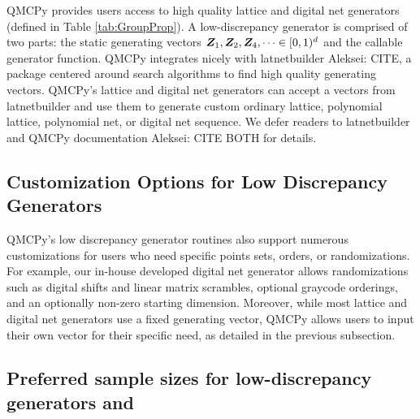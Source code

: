 \documentclass[graybox,footinfo]{svmult}
\newcommand{\AGSComment}[1]{{\color{cyan} Aleksei: #1}}
\begin{document}
QMCPy provides users access to high quality lattice and digital net generators (defined in Table \ref{tab:GroupProp}). A low-discrepancy generator is comprised of two parts: the static generating vectors ${\boldsymbol{Z}}_1,{\boldsymbol{Z}}_2,{\boldsymbol{Z}}_4, \dots \in [0,1)^d$ and the callable generator function. QMCPy integrates nicely with latnetbuilder \AGSComment{CITE}, a package centered around search algorithms to find high quality generating vectors. QMCPy's lattice and digital net generators can accept a vectors from latnetbuilder and use them to generate custom ordinary lattice, polynomial lattice, polynomial net, or digital net sequence. We defer readers to latnetbuilder and QMCPy documentation \AGSComment{CITE BOTH} for details. 

\subsection{Customization Options for Low Discrepancy Generators}

QMCPy's low discrepancy generator routines also support numerous customizations for users who need specific points sets, orders, or randomizations. For example, our in-house developed digital net generator allows randomizations such as digital shifts and linear matrix scrambles, optional graycode orderings, and an optionally non-zero starting dimension. Moreover, while most lattice and digital net generators use a fixed generating vector, QMCPy allows users to input their own vector for their specific need, as detailed in the previous subsection.

\subsection{Preferred sample sizes for low-discrepancy generators and}
\end{document}
